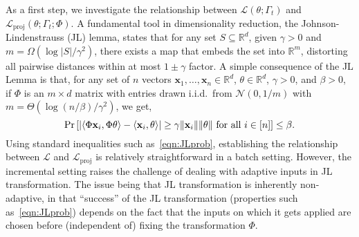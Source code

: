 \documentclass{article}
\theoremstyle{plain}
\newtheorem{theorem}{Theorem}[section]
\def \NNN {\mathcal{N}}
\def \LLL {\mathcal{L}}
\def \proj {{\mathrm{proj}}}
\def \x {\mathbf x}
\def \R {\mathbb{R}}
\begin{document}
As a first step, we investigate the relationship between $\LLL(\theta;\Gamma_t)$ and $\LLL_\proj(\theta;\Gamma_t;\Phi)$. A fundamental tool in dimensionality reduction, the Johnson-Lindenstrauss (JL) lemma, states that for any set $S \subseteq \R^d$, given  $\gamma > 0$ and $m = \Omega(\log |S|/\gamma^2)$, there exists a map that embeds the set into $\R^m$, distorting all pairwise distances within at most $1 \pm \gamma$ factor. A simple consequence of the JL Lemma is that, for any set of $n$ vectors $\x_1,\dots,\x_n \in \R^d$, $\theta \in \R^d$, $\gamma > 0$, and $\beta > 0$, if $\Phi$ is an $m \times d$ matrix with entries drawn i.i.d.\ from $\NNN(0,1/m)$ with $m = \Theta(\log(n/\beta)/\gamma^2)$, we get, 
\begin{equation} \label{eqn:JLprob}
\Pr\left[| \langle \Phi \x_i, \Phi \theta \rangle - \langle \x_i, \theta \rangle | \geq \gamma \| \x_i \| \| \theta \|~\mbox{\rm for all}~i\in[n]\right] \leq \beta.
\end{equation}
Using standard inequalities such as~\eqref{eqn:JLprob}, establishing the relationship between $\LLL$ and $\LLL_\proj$ is relatively straightforward in a batch setting. However, the incremental setting raises the challenge of dealing with adaptive inputs in JL transformation. The issue being that JL transformation is inherently non-adaptive, in that ``success'' of the JL transformation (properties such as~\eqref{eqn:JLprob}) depends on the fact that the inputs on which it gets
applied are chosen before (independent of) fixing the transformation $\Phi$.

\end{document}
